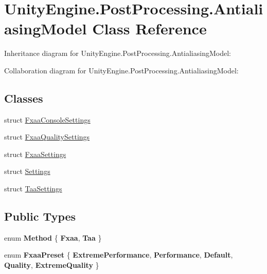 \hypertarget{class_unity_engine_1_1_post_processing_1_1_antialiasing_model}{}\section{Unity\+Engine.\+Post\+Processing.\+Antialiasing\+Model Class Reference}
\label{class_unity_engine_1_1_post_processing_1_1_antialiasing_model}


Inheritance diagram for Unity\+Engine.\+Post\+Processing.\+Antialiasing\+Model\+:


Collaboration diagram for Unity\+Engine.\+Post\+Processing.\+Antialiasing\+Model\+:
\subsection*{Classes}
\begin{DoxyCompactItemize}
\item 
struct \hyperlink{struct_unity_engine_1_1_post_processing_1_1_antialiasing_model_1_1_fxaa_console_settings}{Fxaa\+Console\+Settings}
\item 
struct \hyperlink{struct_unity_engine_1_1_post_processing_1_1_antialiasing_model_1_1_fxaa_quality_settings}{Fxaa\+Quality\+Settings}
\item 
struct \hyperlink{struct_unity_engine_1_1_post_processing_1_1_antialiasing_model_1_1_fxaa_settings}{Fxaa\+Settings}
\item 
struct \hyperlink{struct_unity_engine_1_1_post_processing_1_1_antialiasing_model_1_1_settings}{Settings}
\item 
struct \hyperlink{struct_unity_engine_1_1_post_processing_1_1_antialiasing_model_1_1_taa_settings}{Taa\+Settings}
\end{DoxyCompactItemize}
\subsection*{Public Types}
\begin{DoxyCompactItemize}
\item 
\mbox{\label{class_unity_engine_1_1_post_processing_1_1_antialiasing_model_ab5cf39cfa77f367f530971a77518e89f}} 
enum {\bfseries Method} \{ {\bfseries Fxaa}, 
{\bfseries Taa}
 \}
\item 
\mbox{\label{class_unity_engine_1_1_post_processing_1_1_antialiasing_model_a8fa1e784663b26f942fb5558e3328bc4}} 
enum {\bfseries Fxaa\+Preset} \{ \newline
{\bfseries Extreme\+Performance}, 
{\bfseries Performance}, 
{\bfseries Default}, 
{\bfseries Quality}, 
\newline
{\bfseries Extreme\+Quality}
 \}
\end{DoxyCompactItemize}
